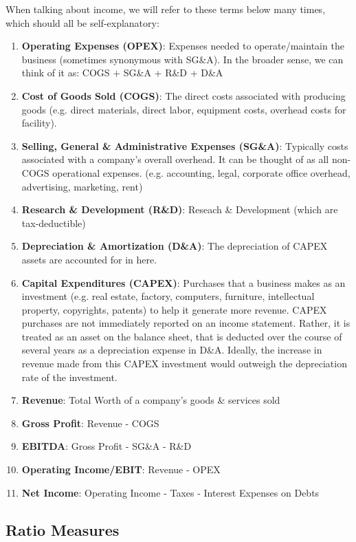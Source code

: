 \documentclass{article}
\begin{document}
    When talking about income, we will refer to these terms below many times, which should all be self-explanatory:
    \begin{enumerate}
      \item \textbf{Operating Expenses (OPEX)}: Expenses needed to operate/maintain the business (sometimes synonymous with SG\&A). In the broader sense, we can think of it as: COGS + SG\&A + R\&D + D\&A
      \item \textbf{Cost of Goods Sold (COGS)}: The direct costs associated with producing goods (e.g. direct materials, direct labor, equipment costs, overhead costs for facility).
      \item \textbf{Selling, General \& Administrative Expenses (SG\&A)}: Typically costs associated with a company's overall overhead. It can be thought of as all non-COGS operational expenses. (e.g. accounting, legal, corporate office overhead, advertising, marketing, rent)
      \item \textbf{Research \& Development (R\&D)}: Reseach \& Development (which are tax-deductible)
      \item \textbf{Depreciation \& Amortization (D\&A)}: The depreciation of CAPEX assets are accounted for in here.
      \item \textbf{Capital Expenditures (CAPEX)}: Purchases that a business makes as an investment (e.g. real estate, factory, computers, furniture, intellectual property, copyrights, patents) to help it generate more revenue. CAPEX purchases are not immediately reported on an income statement. Rather, it is treated as an asset on the balance sheet, that is deducted over the course of several years as a depreciation expense in D\&A. Ideally, the increase in revenue made from this CAPEX investment would outweigh the depreciation rate of the investment.
      \item \textbf{Revenue}:  Total Worth of a company's goods \& services sold
      \item \textbf{Gross Profit}: Revenue - COGS
      \item \textbf{EBITDA}: Gross Profit - SG\&A - R\&D
      \item \textbf{Operating Income/EBIT}: Revenue - OPEX
      \item \textbf{Net Income}: Operating Income - Taxes - Interest Expenses on Debts
    \end{enumerate}

  \subsection{Ratio Measures}
\end{document}
